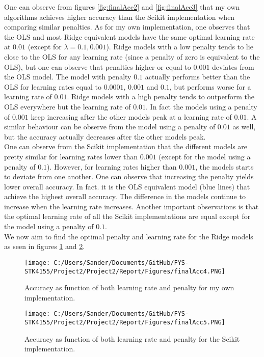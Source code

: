 \documentclass[12pt,a4paper]{article}
\begin{document}
\noindent One can observe from figures \ref{fig:finalAcc2} and \ref{fig:finalAcc3} that my own algorithms achieves higher accuracy than the Scikit implementation when comparing similar penalties. As for my own implementation, one observes that the OLS and most Ridge equivalent models have the same optimal learning rate at $0.01$ (except for $\lambda = 0.1, 0.001$). Ridge models with a low penalty tends to lie close to the OLS for any learning rate (since a penalty of zero is equivalent to the OLS), but one can observe that penalties higher or equal to $0.001$ deviates from the OLS model. The model with penalty $0.1$ actually performs better than the OLS for learning rates equal to $0.0001$, $0.001$ and $0.1$, but performs worse for a learning rate of $0.01$. Ridge models with a high penalty tends to outperform the OLS everywhere but the learning rate of $0.01$. In fact the models using a penalty of $0.001$ keep increasing after the other models peak at a learning rate of $0.01$. A similar behaviour can be observe from the model using a penalty of $0.01$ as well, but the accuracy actually decreases after the other models peak.
\\
One can observe from the Scikit implementation that the different models are pretty similar for learning rates lower than $0.001$ (except for the model using a penalty of $0.1$). However, for learning rates higher than $0.001$, the models starts to deviate from one another. One can observe that increasing the penalty yields lower overall accuracy. In fact. it is the OLS equivalent model (blue lines) that achieve the highest overall accuracy. The difference in the models continue to increase when the learning rate increases. Another important observations is that the optimal learning rate of all the Scikit implementations are equal except for the model using a penalty of $0.1$.
\\
We now aim to find the optimal penalty and learning rate for the Ridge models as seen in figures \ref{fig:finalAcc4} and \ref{fig:finalAcc5}.

\begin{figure}[H]
\centering
\texttt{[image: C:/Users/Sander/Documents/GitHub/FYS-STK4155/Project2/Project2/Report/Figures/finalAcc4.PNG]}
\caption{\label{fig:finalAcc4} Accuracy as function of both learning rate and penalty for my own implementation.}
\end{figure}

\begin{figure}[H]
\centering
\texttt{[image: C:/Users/Sander/Documents/GitHub/FYS-STK4155/Project2/Project2/Report/Figures/finalAcc5.PNG]}
\caption{\label{fig:finalAcc5} Accuracy as function of both learning rate and penalty for the Scikit implementation.}
\end{figure}
\end{document}
